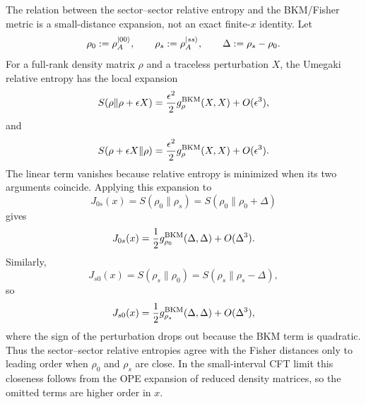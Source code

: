 \documentclass{article}
\theoremstyle{plain}
\theoremstyle{definition}
\theoremstyle{plain}
\begin{document}
The relation between the sector--sector relative entropy and the BKM/Fisher metric is a
small-distance expansion, not an exact finite-\(x\) identity.  Let
\[
    \rho_0:=\rho_A^{\ket{00}},\qquad
    \rho_s:=\rho_A^{\ket{ss}},\qquad
    \Delta:=\rho_s-\rho_0 .
\]
For a full-rank density matrix \(\rho\) and a traceless perturbation \(X\), the Umegaki
relative entropy has the local expansion
\[
    S(\rho\|\rho+\epsilon X)
    =
    \frac{\epsilon^2}{2}g_\rho^{\rm BKM}(X,X)
    +O(\epsilon^3),
\]
and
\[
    S(\rho+\epsilon X\|\rho)
    =
    \frac{\epsilon^2}{2}g_\rho^{\rm BKM}(X,X)
    +O(\epsilon^3).
\]
The linear term vanishes because relative entropy is minimized when its two arguments
coincide. Applying this expansion to
\[
    J_{0s}(x)=S(\rho_0\|\rho_s)=S(\rho_0\|\rho_0+\Delta)
\]
gives
\[
    J_{0s}(x)
    =
    \frac12 g_{\rho_0}^{\rm BKM}(\Delta,\Delta)
    +O(\Delta^3).
\]
Similarly,
\[
    J_{s0}(x)=S(\rho_s\|\rho_0)=S(\rho_s\|\rho_s-\Delta),
\]
so
\[
    J_{s0}(x)
    =
    \frac12 g_{\rho_s}^{\rm BKM}(\Delta,\Delta)
    +O(\Delta^3),
\]
where the sign of the perturbation drops out because the BKM term is quadratic.  Thus
the sector--sector relative entropies agree with the Fisher distances only to leading
order when \(\rho_0\) and \(\rho_s\) are close.  In the small-interval CFT limit this
closeness follows from the OPE expansion of reduced density matrices, so the omitted
terms are higher order in \(x\).
\end{document}
